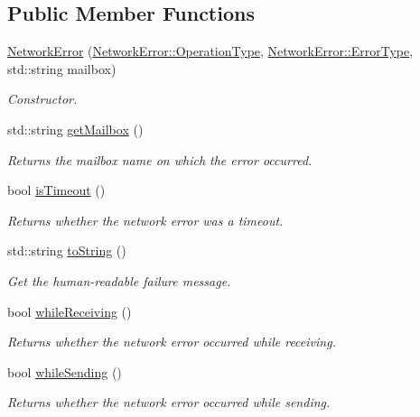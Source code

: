 \subsection*{Public Member Functions}
\begin{DoxyCompactItemize}
\item 
\hyperlink{classwrench_1_1_network_error_ac7718f7a5172d75aeee99b320ddc5487}{Network\+Error} (\hyperlink{classwrench_1_1_network_error_a18331f823c565c53be139bdac90437d8}{Network\+Error\+::\+Operation\+Type}, \hyperlink{classwrench_1_1_network_error_a17ec7046bb91ea4e909c3bf59d46f09b}{Network\+Error\+::\+Error\+Type}, std\+::string mailbox)
\begin{DoxyCompactList}\small\item\em Constructor. \end{DoxyCompactList}\item 
std\+::string \hyperlink{classwrench_1_1_network_error_a0760db02c40d2ba195aa87106951411f}{get\+Mailbox} ()
\begin{DoxyCompactList}\small\item\em Returns the mailbox name on which the error occurred. \end{DoxyCompactList}\item 
bool \hyperlink{classwrench_1_1_network_error_a4aed0a6b6496e19e70e16da31eae8b19}{is\+Timeout} ()
\begin{DoxyCompactList}\small\item\em Returns whether the network error was a timeout. \end{DoxyCompactList}\item 
std\+::string \hyperlink{classwrench_1_1_network_error_a114346c3faa84b3925600e9a22314a37}{to\+String} ()
\begin{DoxyCompactList}\small\item\em Get the human-\/readable failure message. \end{DoxyCompactList}\item 
bool \hyperlink{classwrench_1_1_network_error_a1fa6782fde91dab538f577d2608eb640}{while\+Receiving} ()
\begin{DoxyCompactList}\small\item\em Returns whether the network error occurred while receiving. \end{DoxyCompactList}\item 
bool \hyperlink{classwrench_1_1_network_error_a98a2da5f34bd18fc2c245b364e884b34}{while\+Sending} ()
\begin{DoxyCompactList}\small\item\em Returns whether the network error occurred while sending. \end{DoxyCompactList}\end{DoxyCompactItemize}


